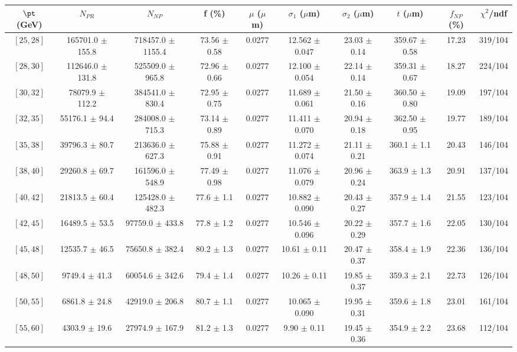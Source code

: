 \begin{tabular}{c||c|c|c|c|c|c|c||c|c}
$\pt$ (GeV) & $N_{PR}$ & $N_{NP}$ & f (\%) & $\mu$ ($\mu$m) & $\sigma_1$ ($\mu$m) & $\sigma_2$ ($\mu$m)  & $t$ ($\mu$m) & $f_{NP}$ (\%) & $\chi^2$/ndf \\
\hline
$[25, 28]$ & 165701.0 $\pm$ 155.8 & 718457.0 $\pm$ 1155.4 & 73.56 $\pm$ 0.58 & 0.0277 & 12.562 $\pm$ 0.047 & 23.03 $\pm$ 0.14 & 359.67 $\pm$ 0.58 & 17.23 & 319/104\\
$[28, 30]$ & 112646.0 $\pm$ 131.8 & 525509.0 $\pm$ 965.8 & 72.96 $\pm$ 0.66 & 0.0277 & 12.100 $\pm$ 0.054 & 22.14 $\pm$ 0.14 & 359.31 $\pm$ 0.67 & 18.27 & 224/104\\
$[30, 32]$ & 78079.9 $\pm$ 112.2 & 384541.0 $\pm$ 830.4 & 72.95 $\pm$ 0.75 & 0.0277 & 11.689 $\pm$ 0.061 & 21.50 $\pm$ 0.16 & 360.50 $\pm$ 0.80 & 19.09 & 197/104\\
$[32, 35]$ & 55176.1 $\pm$ 94.4 & 284008.0 $\pm$ 715.3 & 73.14 $\pm$ 0.89 & 0.0277 & 11.411 $\pm$ 0.070 & 20.94 $\pm$ 0.18 & 362.50 $\pm$ 0.95 & 19.77 & 189/104\\
$[35, 38]$ & 39796.3 $\pm$ 80.7 & 213636.0 $\pm$ 627.3 & 75.88 $\pm$ 0.91 & 0.0277 & 11.272 $\pm$ 0.074 & 21.11 $\pm$ 0.21 & 360.1 $\pm$ 1.1 & 20.43 & 146/104\\
$[38, 40]$ & 29260.8 $\pm$ 69.7 & 161596.0 $\pm$ 548.9 & 77.49 $\pm$ 0.98 & 0.0277 & 11.076 $\pm$ 0.079 & 20.96 $\pm$ 0.24 & 363.9 $\pm$ 1.3 & 20.91 & 137/104\\
$[40, 42]$ & 21813.5 $\pm$ 60.4 & 125428.0 $\pm$ 482.3 & 77.6 $\pm$ 1.1 & 0.0277 & 10.882 $\pm$ 0.090 & 20.43 $\pm$ 0.27 & 357.9 $\pm$ 1.4 & 21.55 & 123/104\\
$[42, 45]$ & 16489.5 $\pm$ 53.5 & 97759.0 $\pm$ 433.8 & 77.8 $\pm$ 1.2 & 0.0277 & 10.546 $\pm$ 0.096 & 20.22 $\pm$ 0.29 & 357.7 $\pm$ 1.6 & 22.05 & 130/104\\
$[45, 48]$ & 12535.7 $\pm$ 46.5 & 75650.8 $\pm$ 382.4 & 80.2 $\pm$ 1.3 & 0.0277 & 10.61 $\pm$ 0.11 & 20.47 $\pm$ 0.37 & 358.4 $\pm$ 1.9 & 22.36 & 136/104\\
$[48, 50]$ & 9749.4 $\pm$ 41.3 & 60054.6 $\pm$ 342.6 & 79.4 $\pm$ 1.4 & 0.0277 & 10.26 $\pm$ 0.11 & 19.85 $\pm$ 0.37 & 359.3 $\pm$ 2.1 & 22.73 & 126/104\\
$[50, 55]$ & 6861.8 $\pm$ 24.8 & 42919.0 $\pm$ 206.8 & 80.7 $\pm$ 1.1 & 0.0277 & 10.065 $\pm$ 0.090 & 19.95 $\pm$ 0.31 & 359.6 $\pm$ 1.8 & 23.01 & 161/104\\
$[55, 60]$ & 4303.9 $\pm$ 19.6 & 27974.9 $\pm$ 167.9 & 81.2 $\pm$ 1.3 & 0.0277 & 9.90 $\pm$ 0.11 & 19.45 $\pm$ 0.36 & 354.9 $\pm$ 2.2 & 23.68 & 112/104\\

\end{tabular}
